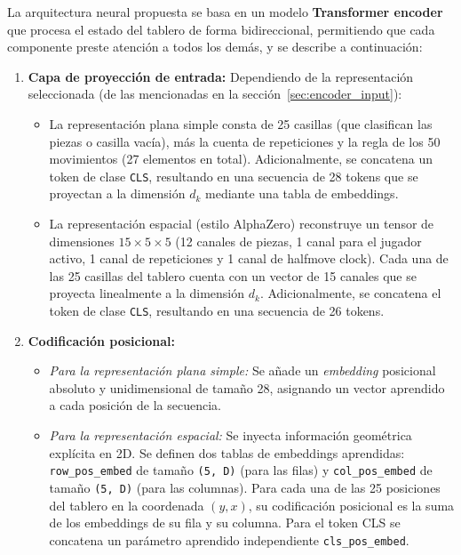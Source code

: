 \documentclass[12pt, a4paper]{article}
\begin{document}
La arquitectura neural propuesta se basa en un modelo \textbf{Transformer encoder} que procesa el estado del tablero de forma bidireccional, permitiendo que cada componente preste atención a todos los demás, y se describe a continuación:
\begin{enumerate}

    \item \textbf{Capa de proyección de entrada:} Dependiendo de la representación seleccionada (de las mencionadas en la sección~\ref{sec:encoder_input}):
    \begin{itemize}
        \item La representación plana simple consta de 25 casillas (que clasifican las piezas o casilla vacía), más la cuenta de repeticiones y la regla de los 50 movimientos (27 elementos en total). Adicionalmente, se concatena un token de clase \texttt{CLS}, resultando en una secuencia de 28 tokens que se proyectan a la dimensión $d_k$ mediante una tabla de embeddings.
        
        \item La representación espacial (estilo AlphaZero) reconstruye un tensor de dimensiones $15 \times 5 \times 5$ (12 canales de piezas, 1 canal para el jugador activo, 1 canal de repeticiones y 1 canal de halfmove clock). Cada una de las 25 casillas del tablero cuenta con un vector de 15 canales que se proyecta linealmente a la dimensión $d_k$. Adicionalmente, se concatena el token de clase \texttt{CLS}, resultando en una secuencia de 26 tokens.

    \end{itemize}
    
    \item \textbf{Codificación posicional:}
    \begin{itemize}
        \item \textit{Para la representación plana simple:} Se añade un \textit{embedding} posicional absoluto y unidimensional de tamaño 28, asignando un vector aprendido a cada posición de la secuencia.
        \item \textit{Para la representación espacial:} Se inyecta información geométrica explícita en 2D. Se definen dos tablas de embeddings aprendidas: \texttt{row\_pos\_embed} de tamaño \texttt{(5, D)} (para las filas) y \texttt{col\_pos\_embed} de tamaño \texttt{(5, D)} (para las columnas). Para cada una de las 25 posiciones del tablero en la coordenada $(y, x)$, su codificación posicional es la suma de los embeddings de su fila y su columna. Para el token CLS se concatena un parámetro aprendido independiente \texttt{cls\_pos\_embed}.
    \end{itemize}
    

\end{enumerate}
\end{document}
